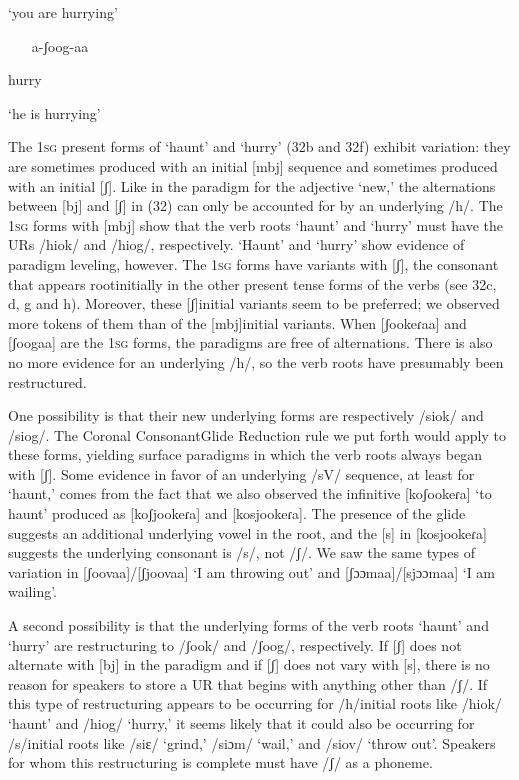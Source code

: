 \textsc{‘}you are hurrying’

\begin{itemize}
\item [a-ʃoog-aa]

\end{itemize}

hurry

\textsc{‘}he is hurrying’

The 1\textsc{sg} present forms of ‘haunt’ and ‘hurry’ (32b and 32f) exhibit variation: they are sometimes produced with an initial [mbj] sequence and sometimes produced with an initial [ʃ]. Like in the paradigm for the adjective ‘new,’ the alternations between [bj] and [ʃ] in (32) can only be accounted for by an underlying /h/. The 1\textsc{sg} forms with [mbj] show that the verb roots ‘haunt’ and ‘hurry’ must have the URs /hiok/ and /hiog/, respectively. ‘Haunt’ and ‘hurry’ show evidence of paradigm leveling, however. The 1\textsc{sg} forms have variants with [ʃ], the consonant that appears rootinitially in the other present tense forms of the verbs (see 32c, d, g and h). Moreover, these [ʃ]initial variants seem to be preferred; we observed more tokens of them than of the [mbj]initial variants. When [ʃookeɾaa] and [ʃoogaa] are the 1\textsc{sg} forms, the paradigms are free of alternations. There is also no more evidence for an underlying /h/, so the verb roots have presumably been restructured. 

One possibility is that their new underlying forms are respectively /siok/ and /siog/. The Coronal ConsonantGlide Reduction rule we put forth would apply to these forms, yielding surface paradigms in which the verb roots always began with [ʃ]. Some evidence in favor of an underlying /sV/ sequence, at least for ‘haunt,’ comes from the fact that we also observed the infinitive [koʃookeɾa] ‘to haunt’ produced as [koʃjookeɾa] and [kosjookeɾa]. The presence of the glide suggests an additional underlying vowel in the root, and the [s] in [kosjookeɾa] suggests the underlying consonant is /s/, not /ʃ/. We saw the same types of variation in [ʃoovaa]/[ʃjoovaa] ‘I am throwing out’ and [ʃɔɔmaa]/[sjɔɔmaa] ‘I am wailing’. 

A second possibility is that the underlying forms of the verb roots ‘haunt’ and ‘hurry’ are restructuring to /ʃook/ and /ʃoog/, respectively. If [ʃ] does not alternate with [bj] in the paradigm and if [ʃ] does not vary with [s], there is no reason for speakers to store a UR that begins with anything other than /ʃ/. If this type of restructuring appears to be occurring for /h/initial roots like /hiok/ ‘haunt’ and /hiog/ ‘hurry,’ it seems likely that it could also be occurring for /s/initial roots like /siɛ/ ‘grind,’ /siɔm/ ‘wail,’ and /siov/ ‘throw out’. Speakers for whom this restructuring is complete must have /ʃ/ as a phoneme. 

